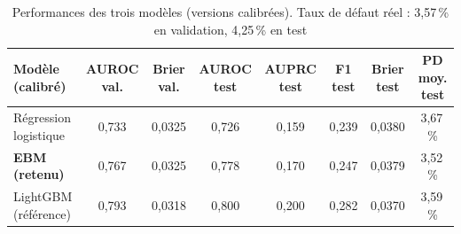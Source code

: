 \begin{table}[htbp]
\centering
\footnotesize\setlength{\tabcolsep}{4pt}
\caption{Performances des trois modèles (versions calibrées). Taux de défaut réel : 3,57\,\% en validation, 4,25\,\% en test}\label{tab:modeles}
\begin{tabular}{lccccccc}
\toprule
Modèle (calibré) & AUROC val. & Brier val. & AUROC test & AUPRC test & F1 test & Brier test & PD moy. test \\
\midrule
Régression logistique & 0,733 & 0,0325 & 0,726 & 0,159 & 0,239 & 0,0380 & 3,67\,\% \\
\textbf{EBM (retenu)} & 0,767 & 0,0325 & 0,778 & 0,170 & 0,247 & 0,0379 & 3,52\,\% \\
LightGBM (référence) & 0,793 & 0,0318 & 0,800 & 0,200 & 0,282 & 0,0370 & 3,59\,\% \\
\bottomrule
\end{tabular}
\end{table}
